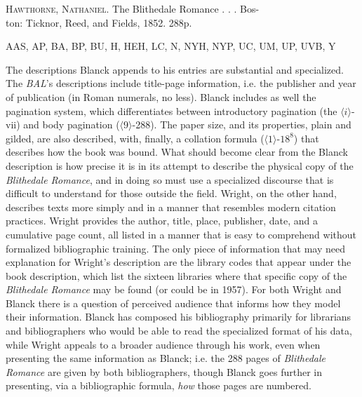 \begin{displayquote}
\textsc{Hawthorne, Nathaniel.} The Blithedale Romance . . . Bos- \\ \hspace*{1 pc} ton: Ticknor, Reed, and Fields, 1852.  288p. \begin{flushright}
\vspace*{-5mm} \textsc{AAS, AP, BA, BP, BU, H, HEH, LC, N, NYH, NYP, UC, UM, UP, UVB, Y}\autocite[153]{wright_american_1957}\end{flushright}
\end{displayquote}

The descriptions Blanck appends to his entries are substantial and specialized. The \textit{BAL}'s descriptions include title-page information, i.e. the publisher and year of publication (in Roman numerals, no less). Blanck includes as well the pagination system, which differentiates between introductory pagination (the $\langle i \rangle$-vii) and body pagination ($\langle 9 \rangle$-288). The paper size, and its properties, plain and gilded, are also described, with, finally, a collation formula ($\langle 1 \rangle$-$18^8$) that describes how the book was bound. What should become clear from the Blanck description is how precise it is in its attempt to describe the physical copy of the \textit{Blithedale Romance}, and in doing so must use a specialized discourse that is difficult to understand for those outside the field. Wright, on the other hand, describes texts more simply and in a manner that resembles modern citation practices. Wright provides the author, title, place, publisher, date, and a cumulative page count, all listed in a manner that is easy to comprehend without formalized bibliographic training. The only piece of information that may need explanation for Wright's description are the library codes that appear under the book description, which list the sixteen libraries where that specific copy of the \textit{Blithedale Romance} may be found (or could be in 1957). For both Wright and Blanck there is a question of perceived audience that informs how they model their information. Blanck has composed his bibliography primarily for librarians and bibliographers who would be able to read the specialized format of his data, while Wright appeals to a broader audience through his work, even when presenting the same information as Blanck; i.e. the 288 pages of \textit{Blithedale Romance} are given by both bibliographers, though Blanck goes further in presenting, via a bibliographic formula, \textit{how} those pages are numbered. 

